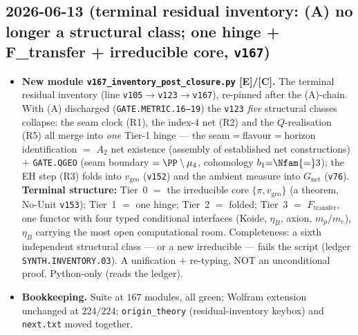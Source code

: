 \documentclass[11pt]{article}
\providecommand{\mE}{\textbf{[E]}}\providecommand{\mC}{\textbf{[C]}}
\providecommand{\vref}[1]{\texttt{#1}}
\begin{document}
\subsection*{2026-06-13 (terminal residual inventory: (A) no longer a structural class; one hinge + F\_transfer + irreducible core, \vref{v167})}
\begin{itemize}
\item \textbf{New module \texttt{v167\_inventory\_post\_closure.py} \mE/\mC.} The terminal residual
  inventory (line \vref{v105}$\to$\vref{v123}$\to$\vref{v167}), re-pinned after the (A)-chain. With (A)
  discharged (\texttt{GATE.METRIC.16--19}) the \vref{v123} \emph{five} structural classes collapse: the
  seam clock (R1), the index-$4$ net (R2) and the $Q$-realisation (R5) all merge into \emph{one} Tier-1
  hinge --- the seam$=$flavour$=$horizon identification $=$ $A_2$ net existence (assembly of established
  net constructions) $+$ \texttt{GATE.QGEO} (seam boundary $=\PP\setminus\mu_4$, cohomology
  $b_1{=}\Nfam{=}3$); the EH step (R3) folds into $v_{\mathrm{geo}}$ (\vref{v152}) and the ambient measure
  into $G_{\mathrm{net}}$ (\vref{v76}). \textbf{Terminal structure:} Tier~0 $=$ the irreducible core
  $\{\pi,v_{\mathrm{geo}}\}$ (a theorem, No-Unit \vref{v153}); Tier~1 $=$ one hinge; Tier~2 $=$ folded;
  Tier~3 $=$ $F_{\mathrm{transfer}}$, one functor with four typed conditional interfaces (Koide, $\eta_B$,
  axion, $m_p/m_e$), $\eta_B$ carrying the most open computational room. Completeness: a sixth independent
  structural class --- or a new irreducible --- fails the script (ledger \texttt{SYNTH.INVENTORY.03}). A
  unification $+$ re-typing, NOT an unconditional proof. Python-only (reads the ledger).
\item \textbf{Bookkeeping.} Suite at $167$ modules, all green; Wolfram extension unchanged at $224/224$;
  \texttt{origin\_theory} (residual-inventory keybox) and \texttt{next.txt} moved together.
\end{itemize}
\end{document}
